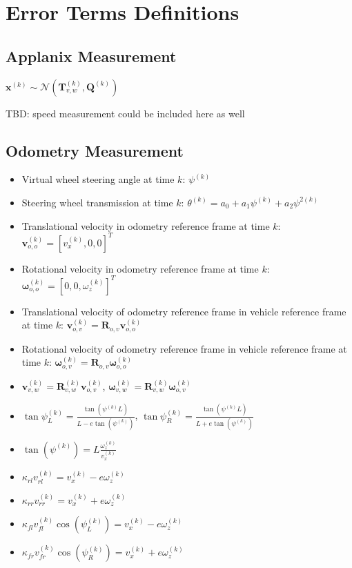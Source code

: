 \documentclass[12pt]{article}
\begin{document}
  \section{Error Terms Definitions}\label{sec:errors}
    \subsection{Applanix Measurement}
      $\mathbf{x}^{(k)}\sim\mathcal{N}(\mathbf{T}_{v,w}^{(k)},
        \mathbf{Q}^{(k)})$

      \noindent TBD: speed measurement could be included here as well

    \subsection{Odometry Measurement}
      \begin{itemize}
        \item Virtual wheel steering angle at time $k$:
          $\psi^{(k)}$
        \item Steering wheel transmission at time $k$:
          $\theta^{(k)} = a_0 + a_1\psi^{(k)} + a_2\psi^{2(k)}$
        \item Translational velocity in odometry reference frame at time $k$:
          $\mathbf{v}_{o,o}^{(k)}=[v_x^{(k)},0,0]^T$
        \item Rotational velocity in odometry reference frame at time $k$:
          $\boldsymbol{\omega}_{o,o}^{(k)}=[0,0,\omega_z^{(k)}]^T$
        \item Translational velocity of odometry reference frame in vehicle
          reference frame at time $k$:
          $\mathbf{v}_{o,v}^{(k)}=\mathbf{R}_{o,v}\mathbf{v}_{o,o}^{(k)}$
        \item Rotational velocity of odometry reference frame in vehicle
          reference frame at time $k$:
          $\boldsymbol{\omega}_{o,v}^{(k)}=
          \mathbf{R}_{o,v}\boldsymbol{\omega}_{o,o}^{(k)}$
         \item $\mathbf{v}_{v,w}^{(k)}=\mathbf{R}_{v,w}^{(k)}
           \mathbf{v}_{o,v}^{(k)}$,
           $\boldsymbol{\omega}_{v,w}^{(k)}=\mathbf{R}_{v,w}^{(k)}
           \boldsymbol{\omega}_{o,v}^{(k)}$
         \item $\tan\psi_L^{(k)}=
           \frac{\tan(\psi^{(k)} L)}{L - e\tan(\psi^{(k)})}$,
           $\tan\psi_R^{(k)}=\frac{\tan(\psi^{(k)} L)}{L + e\tan(\psi^{(k)})}$
         \item $\tan(\psi^{(k)})=L\frac{\omega_z^{(k)}}{v_x^{(k)}}$
         \item $\kappa_{rl}v_{rl}^{(k)}=v_x^{(k)}-e\omega_z^{(k)}$
         \item $\kappa_{rr}v_{rr}^{(k)}=v_x^{(k)}+e\omega_z^{(k)}$
         \item $\kappa_{fl}v_{fl}^{(k)}\cos(\psi_L^{(k)})=
           v_x^{(k)}-e\omega_z^{(k)}$
         \item $\kappa_{fr}v_{fr}^{(k)}\cos(\psi_R^{(k)})=
           v_x^{(k)}+e\omega_z^{(k)}$
      \end{itemize}
\end{document}
